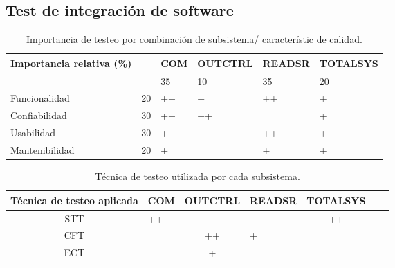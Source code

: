 \documentclass[
11pt, %
]{charter}
\begin{document}
\subsection{Test de integración de software}
\begin{table}[ht]
    \centering
    \begin{tabular}{|l|l|l|l|l|l|}\hline \hline
    \rowcolor[HTML]{d6c6c3}
 Importancia relativa (\%)& &  COM & OUTCTRL & READSR & TOTALSYS\\
        \hline
       
            &  &35 & 10 &35 & 20                          \\
        Funcionalidad    & 20 & ++ & + & ++ & +		\\
        Confiabilidad    & 30 & ++ & ++ & & +                        \\
        Usabilidad       & 30 & ++ & + & ++ & +                        \\
        Mantenibilidad   & 20 & + & & + & +                        \\
        \hline
    \end{tabular}
    \caption{Importancia de testeo por combinación de subsistema/ característic de calidad.}
\end{table}


\begin{table}[ht]
    \centering
    \begin{tabularx}{\linewidth}{@{}|c|X|c|X|c|X|c|@{}}\hline \hline
    \rowcolor[HTML]{d6c6c3}
 Técnica de testeo aplicada & COM & OUTCTRL & READSR & TOTALSYS\\
        \hline
       STT & ++ & & & ++ \\
      CFT & & ++ & + & \\
      ECT & & + & &  \\
        \hline
    \end{tabularx}
    \caption{Técnica de testeo utilizada por cada subsistema.}
\end{table}
\end{document}
